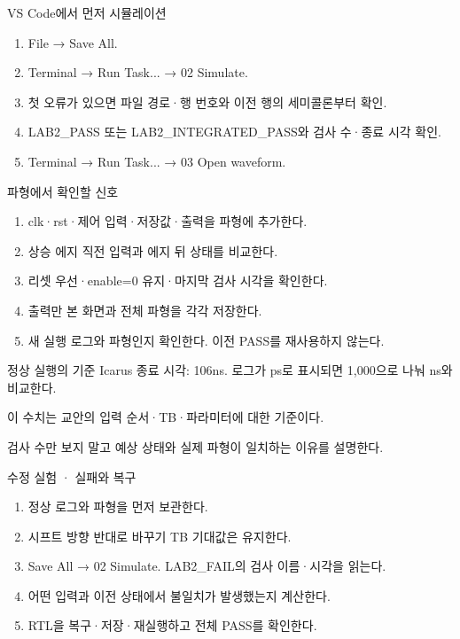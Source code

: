 \begin{frame}[label=simulation]{VS Code에서 먼저 시뮬레이션}
\small
\begin{enumerate}
\item File → Save All.
\item Terminal → Run Task... → 02 Simulate.
\item 첫 오류가 있으면 파일 경로·행 번호와 이전 행의 세미콜론부터 확인.
\item LAB2\_PASS 또는 LAB2\_INTEGRATED\_PASS와 검사 수·종료 시각 확인.
\item Terminal → Run Task... → 03 Open waveform.
\end{enumerate}
\end{frame}

\begin{frame}{파형에서 확인할 신호}
\small
\begin{enumerate}
\item clk·rst·제어 입력·저장값·출력을 파형에 추가한다.
\item 상승 에지 직전 입력과 에지 뒤 상태를 비교한다.
\item 리셋 우선·enable=0 유지·마지막 검사 시각을 확인한다.
\item 출력만 본 화면과 전체 파형을 각각 저장한다.
\item 새 실행 로그와 파형인지 확인한다. 이전 PASS를 재사용하지 않는다.
\end{enumerate}
\end{frame}

\begin{frame}{정상 실행의 기준}
\small
{}Icarus 종료 시각: 106ns. 로그가 ps로 표시되면 1,000으로 나눠 ns와 비교한다.\par\vspace{0.26cm}이 수치는 교안의 입력 순서·TB·파라미터에 대한 기준이다.\par\vspace{0.26cm}검사 수만 보지 말고 예상 상태와 실제 파형이 일치하는 이유를 설명한다.\par
\end{frame}

\begin{frame}{수정 실험 · 실패와 복구}
\small
\begin{enumerate}
\item 정상 로그와 파형을 먼저 보관한다.
\item 시프트 방향 반대로 바꾸기 TB 기대값은 유지한다.
\item Save All → 02 Simulate. LAB2\_FAIL의 검사 이름·시각을 읽는다.
\item 어떤 입력과 이전 상태에서 불일치가 발생했는지 계산한다.
\item RTL을 복구·저장·재실행하고 전체 PASS를 확인한다.
\end{enumerate}
\end{frame}

